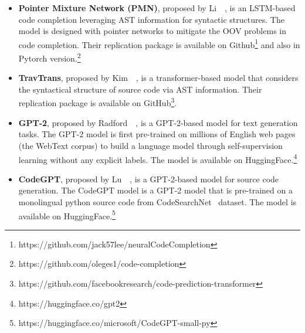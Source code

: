 \begin{itemize}
    \item \textbf{Pointer Mixture Network (PMN)}, proposed by Li~\ea~\cite{li2017code}, is an LSTM-based code completion
    leveraging AST information for syntactic structures.
    The model is designed with pointer networks to mitigate the OOV problems in code completion.
    Their replication package is available on Github\footnote{https://github.com/jack57lee/neuralCodeCompletion} and also in Pytorch version.\footnote{https://github.com/oleges1/code-completion}

    \item \textbf{TravTrans}, proposed by Kim~\ea~\cite{kim2021code}, is a transformer-based model that considers the syntactical structure of source code via AST information.
    Their replication package is available on GitHub\footnote{https://github.com/facebookresearch/code-prediction-transformer}.
    
    \item \textbf{GPT-2}, proposed by Radford~\ea~\cite{radford2019language}, is a GPT-2-based model for text generation tasks. 
    The GPT-2 model is first pre-trained on millions of English web pages (the WebText corpus) to build a language model through self-supervision learning without any explicit labels. 
    The model is available on HuggingFace.\footnote{https://huggingface.co/gpt2}
    
    \item \textbf{CodeGPT}, proposed by Lu~\ea~\cite{lu2021codexglue}, is a GPT-2-based model for source code generation.
    The CodeGPT model is a GPT-2 model that is pre-trained on a monolingual python source code from CodeSearchNet~\cite{husain2019codesearchnet} dataset.
    The model is available on HuggingFace.\footnote{https://huggingface.co/microsoft/CodeGPT-small-py}
    
\end{itemize}